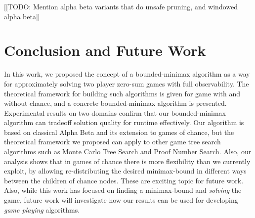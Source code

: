 \documentclass[letterpaper]{article} %
\begin{document}
[[TODO: Mention alpha beta variants that do unsafe pruning, and windowed alpha beta]]

\section{Conclusion and Future Work}
In this work, we proposed the concept of a bounded-minimax algorithm as a way for approximately solving two player zero-sum games with full observability. The theoretical framework for building such algorithms is given for game with and without chance, and a concrete bounded-minimax algorithm is presented. Experimental results on two domains confirm that our bounded-minimax algorithm can tradeoff solution quality for runtime effectively. Our algorithm is based on classical Alpha Beta and its extension to games of chance, but the theoretical framework we proposed can apply to other game tree search algorithms such as Monte Carlo Tree Search and Proof Number Search. 
Also, our analysis shows that in games of chance there is more flexibility than we currently exploit, by allowing re-distributing the desired minimax-bound in different ways between the children of chance nodes. These are exciting topic for future work. Also, while this work has focused on finding a minimax-bound and \emph{solving} the game, future work will investigate how our results can be used for developing \emph{game playing} algorithms. 




\end{document}
